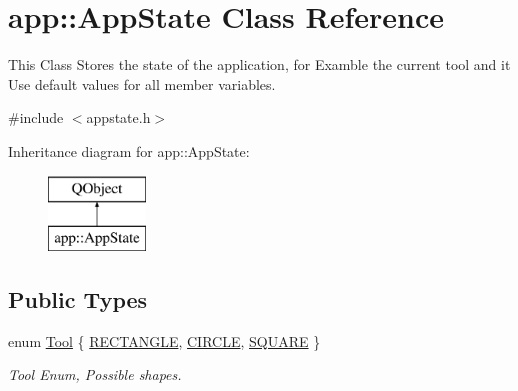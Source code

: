 \hypertarget{classapp_1_1_app_state}{}\section{app\+:\+:App\+State Class Reference}
\label{classapp_1_1_app_state}


This Class Stores the state of the application, for Examble the current tool and it Use default values for all member variables.  




{\ttfamily \#include $<$appstate.\+h$>$}

Inheritance diagram for app\+:\+:App\+State\+:\begin{figure}[H]
\begin{center}
\leavevmode
\includegraphics[height=2.000000cm]{classapp_1_1_app_state}
\end{center}
\end{figure}
\subsection*{Public Types}
\begin{DoxyCompactItemize}
\item 
enum \mbox{\hyperlink{classapp_1_1_app_state_aa641298e5827611da2512591c4a0e966}{Tool}} \{ \mbox{\hyperlink{classapp_1_1_app_state_aa641298e5827611da2512591c4a0e966aa9aa485597b649cc4db197bb200d95dc}{R\+E\+C\+T\+A\+N\+G\+LE}}, 
\mbox{\hyperlink{classapp_1_1_app_state_aa641298e5827611da2512591c4a0e966a112f1d74b0e0ce3d3284a1335a8f55e6}{C\+I\+R\+C\+LE}}, 
\mbox{\hyperlink{classapp_1_1_app_state_aa641298e5827611da2512591c4a0e966a11b967f8a13bcf8ea0e5b4d068b62094}{S\+Q\+U\+A\+RE}}
 \}
\begin{DoxyCompactList}\small\item\em Tool Enum, Possible shapes. \end{DoxyCompactList}\end{DoxyCompactItemize}
